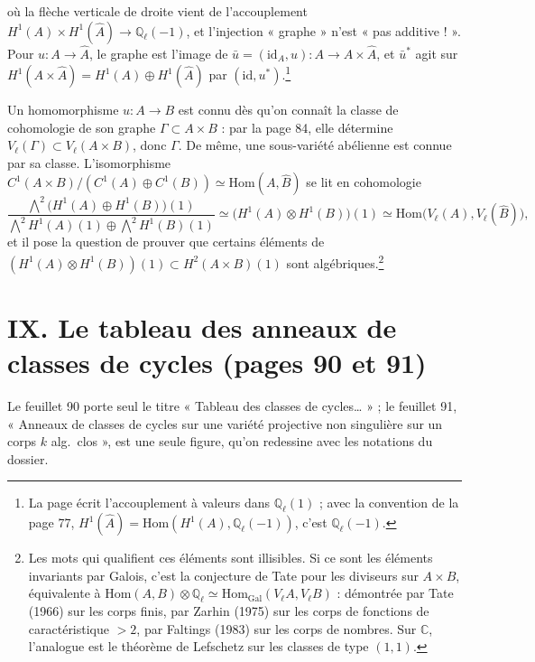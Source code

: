 \documentclass[11pt,a4paper]{article}
\begin{document}
où la flèche verticale de droite vient de l'accouplement $H^{1}(A) \times
H^{1}(\hat{A}) \to \mathbb{Q}_{\ell}(-1)$, et l'injection « graphe » n'est « pas
additive ! ». Pour $u \colon A \to \hat{A}$, le graphe est l'image de $\bar{u} =
(\mathrm{id}_{A}, u) \colon A \to A \times \hat{A}$, et $\bar{u}^{*}$ agit sur
$H^{1}(A \times \hat{A}) = H^{1}(A) \oplus H^{1}(\hat{A})$ par
$(\mathrm{id}, u^{*})$.\footnote{La page écrit l'accouplement à valeurs dans
$\mathbb{Q}_{\ell}(1)$ ; avec la convention de la page 77, $H^{1}(\hat{A}) =
\mathrm{Hom}(H^{1}(A), \mathbb{Q}_{\ell}(-1))$, c'est $\mathbb{Q}_{\ell}(-1)$.}

Un homomorphisme $u \colon A \to B$ est connu dès qu'on connaît la classe de
cohomologie de son graphe $\Gamma \subset A \times B$ : par la page 84, elle
détermine $V_{\ell}(\Gamma) \subset V_{\ell}(A \times B)$, donc $\Gamma$. De même,
une sous-variété abélienne est connue par sa classe. L'isomorphisme $C^{1}(A
\times B)/(C^{1}(A) \oplus C^{1}(B)) \simeq \mathrm{Hom}(A, \hat{B})$ se lit en
cohomologie
\[
\frac{\bigwedge^{2}\bigl(H^{1}(A) \oplus H^{1}(B)\bigr)(1)}{\bigwedge^{2}H^{1}(A)(1)
\oplus \bigwedge^{2}H^{1}(B)(1)} \simeq \bigl(H^{1}(A) \otimes H^{1}(B)\bigr)(1)
\simeq \mathrm{Hom}\bigl(V_{\ell}(A), V_{\ell}(\hat{B})\bigr) ,
\]
et il pose la question de prouver que certains éléments de $(H^{1}(A) \otimes
H^{1}(B))(1) \subset H^{2}(A \times B)(1)$ sont algébriques.\footnote{Les mots
qui qualifient ces éléments sont illisibles. Si ce sont les éléments invariants
par Galois, c'est la conjecture de Tate pour les diviseurs sur $A \times B$,
équivalente à $\mathrm{Hom}(A, B) \otimes \mathbb{Q}_{\ell} \simeq
\mathrm{Hom}_{\mathrm{Gal}}(V_{\ell}A, V_{\ell}B)$ : démontrée par Tate (1966) sur
les corps finis, par Zarhin (1975) sur les corps de fonctions de
caractéristique $> 2$, par Faltings (1983) sur les corps de nombres. Sur
$\mathbb{C}$, l'analogue est le théorème de Lefschetz sur les classes de type
$(1,1)$.}

\section*{IX. Le tableau des anneaux de classes de cycles (pages 90 et 91)}

Le feuillet 90 porte seul le titre « Tableau des classes de cycles… » ; le
feuillet 91, « Anneaux de classes de cycles sur une variété projective non
singulière sur un corps $k$ alg.\ clos », est une seule figure, qu'on redessine
avec les notations du dossier.
\end{document}
